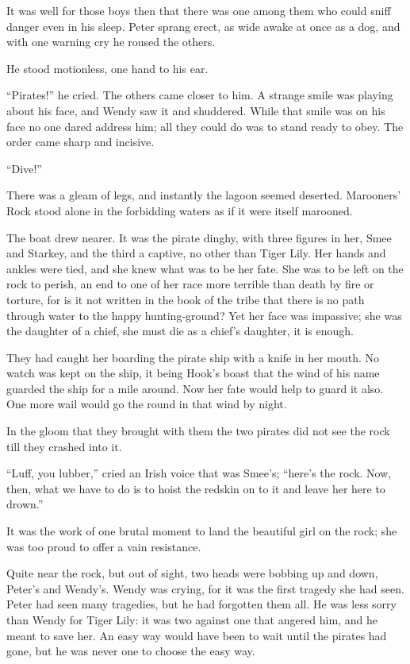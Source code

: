 It was well for those boys then that there was one among them who could sniff danger even in his sleep.
Peter sprang erect, as wide awake at once as a dog, and with one warning cry he roused the others.

He stood motionless, one hand to his ear.

“Pirates!\@” he cried.
The others came closer to him.
A strange smile was playing about his face, and Wendy saw it and shuddered.
While that smile was on his face no one dared address him;
all they could do was to stand ready to obey.
The order came sharp and incisive.

“Dive!”

There was a gleam of legs, and instantly the lagoon seemed deserted.
Marooners’ Rock stood alone in the forbidding waters as if it were itself marooned.

The boat drew nearer.
It was the pirate dinghy, with three figures in her,
Smee and Starkey, and the third a captive, no other than Tiger Lily.
Her hands and ankles were tied, and she knew what was to be her fate.
She was to be left on the rock to perish,
an end to one of her race more terrible than death by fire or torture,
for is it not written in the book of the tribe that there is no path through water to the happy hunting‐ground?
Yet her face was impassive;
she was the daughter of a chief, she must die as a chief’s daughter, it is enough.

They had caught her boarding the pirate ship with a knife in her mouth.
No watch was kept on the ship, it being Hook’s boast that the wind of his name guarded the ship for a mile around.
Now her fate would help to guard it also.
One more wail would go the round in that wind by night.

In the gloom that they brought with them the two pirates did not see the rock till they crashed into it.

“Luff, you lubber,” cried an Irish voice that was Smee’s;
“here’s the rock.
Now, then, what we have to do is to hoist the redskin on to it and leave her here to drown.”

It was the work of one brutal moment to land the beautiful girl on the rock;
she was too proud to offer a vain resistance.

Quite near the rock, but out of sight, two heads were bobbing up and down, Peter’s and Wendy’s.
Wendy was crying, for it was the first tragedy she had seen.
Peter had seen many tragedies, but he had forgotten them all.
He was less sorry than Wendy for Tiger Lily:
it was two against one that angered him, and he meant to save her.
An easy way would have been to wait until the pirates had gone,
but he was never one to choose the easy way.

